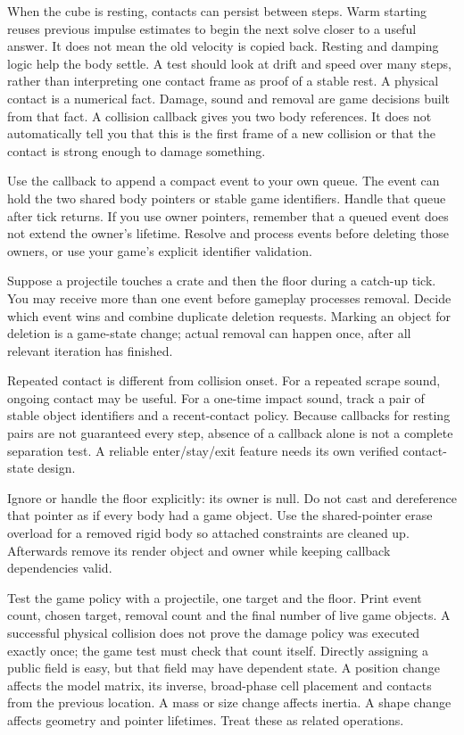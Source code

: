 \documentclass[11pt,a4paper]{article}
\begin{document}
When the cube is resting, contacts can persist between steps. Warm starting reuses previous impulse estimates to begin the next solve closer to a useful answer. It does not mean the old velocity is copied back. Resting and damping logic help the body settle. A test should look at drift and speed over many steps, rather than interpreting one contact frame as proof of a stable rest.
A physical contact is a numerical fact. Damage, sound and removal are game decisions built from that fact. A collision callback gives you two body references. It does not automatically tell you that this is the first frame of a new collision or that the contact is strong enough to damage something.

Use the callback to append a compact event to your own queue. The event can hold the two shared body pointers or stable game identifiers. Handle that queue after tick returns. If you use owner pointers, remember that a queued event does not extend the owner's lifetime. Resolve and process events before deleting those owners, or use your game's explicit identifier validation.

Suppose a projectile touches a crate and then the floor during a catch-up tick. You may receive more than one event before gameplay processes removal. Decide which event wins and combine duplicate deletion requests. Marking an object for deletion is a game-state change; actual removal can happen once, after all relevant iteration has finished.

Repeated contact is different from collision onset. For a repeated scrape sound, ongoing contact may be useful. For a one-time impact sound, track a pair of stable object identifiers and a recent-contact policy. Because callbacks for resting pairs are not guaranteed every step, absence of a callback alone is not a complete separation test. A reliable enter/stay/exit feature needs its own verified contact-state design.

Ignore or handle the floor explicitly: its owner is null. Do not cast and dereference that pointer as if every body had a game object. Use the shared-pointer erase overload for a removed rigid body so attached constraints are cleaned up. Afterwards remove its render object and owner while keeping callback dependencies valid.

Test the game policy with a projectile, one target and the floor. Print event count, chosen target, removal count and the final number of live game objects. A successful physical collision does not prove the damage policy was executed exactly once; the game test must check that count itself.
Directly assigning a public field is easy, but that field may have dependent state. A position change affects the model matrix, its inverse, broad-phase cell placement and contacts from the previous location. A mass or size change affects inertia. A shape change affects geometry and pointer lifetimes. Treat these as related operations.
\end{document}
